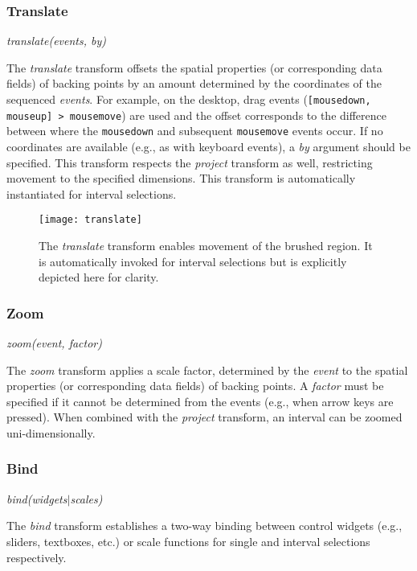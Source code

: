 \subsubsection{Translate}

\centerline{\emph{translate(events, by)}}

The \emph{translate} transform offsets the spatial properties (or corresponding
data fields) of backing points by an amount determined by the coordinates of the
sequenced \emph{events}. For example, on the desktop, drag events
(\texttt{[mousedown, mouseup] > mousemove}) are used and the offset corresponds
to the difference between where the \texttt{mousedown} and subsequent
\texttt{mousemove} events occur. If no coordinates are available (e.g., as with
keyboard events), a \emph{by} argument should be specified. This transform
respects the \emph{project} transform as well, restricting movement to the
specified dimensions. This transform is automatically instantiated for interval
selections.

\begin{figure}[h!]
  \centering
  \texttt{[image: translate]}
  \caption{The \emph{translate} transform enables movement of the brushed
  region. It is automatically invoked for interval selections but is
  explicitly depicted here for clarity.}
  \label{fig:vl:translate}
\end{figure}

\subsubsection{Zoom}

\centerline{\emph{zoom(event, factor)}}

The \emph{zoom} transform applies a scale factor, determined by the \emph{event}
to the spatial properties (or corresponding data fields) of backing points. A
\emph{factor} must be specified if it cannot be determined from the events
(e.g., when arrow keys are pressed). When combined with the \emph{project}
transform, an interval can be zoomed uni-dimensionally.

\subsubsection{Bind}

\centerline{\emph{bind(widgets$|$scales)}}

The \emph{bind} transform establishes a two-way binding between control widgets
(e.g., sliders, textboxes, etc.) or scale functions for single and interval
selections respectively.

